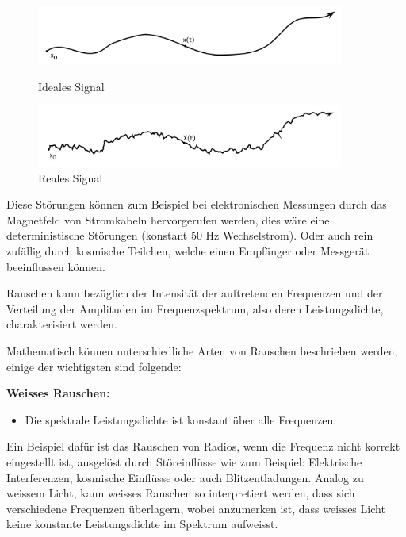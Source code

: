 \begin{figure}
	\centering
	\begin{minipage}{0.45\textwidth}
		\centering
		\includegraphics[width=0.9\textwidth]{papers/brown/images/idealSignal.png}
		\caption{Ideales Signal}
		\label{idealSignal}
	\end{minipage}
	\hspace{0.05\linewidth}
	\begin{minipage}{0.45\textwidth}
		\centering
		\includegraphics[width=0.9\textwidth]{papers/brown/images/realSignal.png}
		\caption{Reales Signal}
		\label{realSignal}
	\end{minipage}
\end{figure}

Diese Störungen können zum Beispiel bei elektronischen Messungen durch das Magnetfeld von Stromkabeln hervorgerufen werden, dies wäre eine deterministische Störungen (konstant 50 Hz Wechselstrom). Oder auch rein zufällig durch kosmische Teilchen, welche einen Empfänger oder Messgerät beeinflussen können.

Rauschen kann bezüglich der Intensität der auftretenden Frequenzen und der Verteilung der Amplituden im Frequenzspektrum, also deren Leistungsdichte, charakterisiert werden.


Mathematisch können unterschiedliche Arten von Rauschen beschrieben werden, einige der wichtigsten sind folgende: 

\begin{definition}{\bf Weisses Rauschen:}
	\begin{itemize}
		\item Die spektrale Leistungsdichte ist konstant über alle Frequenzen. 
	\end{itemize}
\end{definition}


Ein Beispiel dafür ist das Rauschen von Radios, wenn die Frequenz nicht korrekt eingestellt ist, ausgelöst durch Störeinflüsse wie zum Beispiel: Elektrische Interferenzen, kosmische Einflüsse oder auch Blitzentladungen. Analog zu weissem Licht, kann weisses Rauschen so interpretiert werden, dass sich verschiedene Frequenzen überlagern, wobei anzumerken ist, dass weisses Licht keine konstante Leistungsdichte im Spektrum aufweisst.

